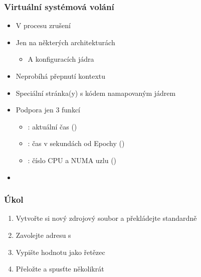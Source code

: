 \begin{frame}
  \frametitle{Virtuální systémová volání}

  \begin{itemize}
    \item V procesu zrušení

    \pause

    \item Jen na některých architekturách
    \begin{itemize}
      \item A konfiguracích jádra
    \end{itemize}

    \item Neprobíhá přepnutí kontextu
    \item Speciální stránka(y) s kódem namapovaným jádrem
    \item Podpora jen 3 funkcí
    \begin{itemize}
      \item {}: aktuální čas ()
      \item {}: čas v sekundách od Epochy ()
      \item {}: číslo CPU a NUMA uzlu ()
    \end{itemize}

    \item {} 

%
  \end{itemize}

\end{frame}

\begin{frame}
  \frametitle{Úkol}

  \begin{enumerate}
    \item Vytvořte si nový zdrojový soubor a překládejte standardně
    \item Zavolejte adresu s 
    \item Vypište hodnotu jako řetězec
    \item Přeložte a spusťte několikrát
  \end{enumerate}

\end{frame}

